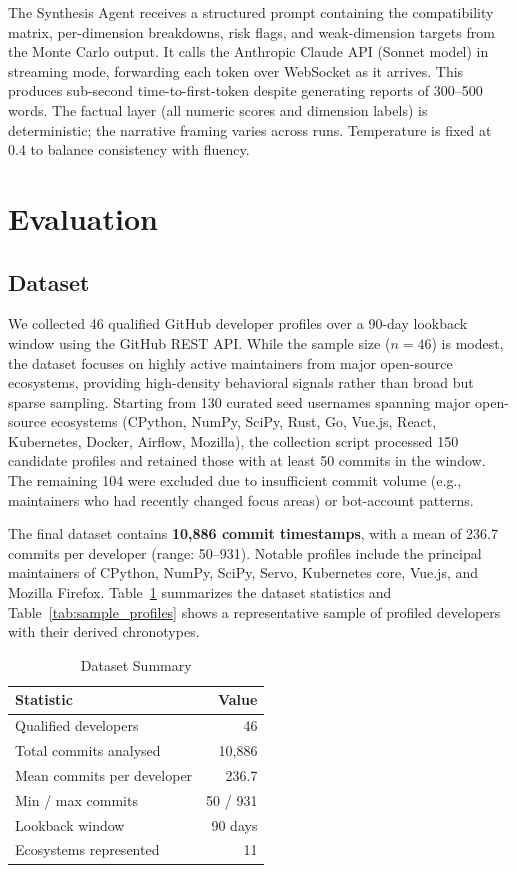 \documentclass[conference]{IEEEtran}
\begin{document}
The Synthesis Agent receives a structured prompt containing the
compatibility matrix, per-dimension breakdowns, risk flags, and
weak-dimension targets from the Monte Carlo output.  It calls the
Anthropic Claude API (Sonnet model) in streaming mode,
forwarding each token over WebSocket as it arrives.  This produces
sub-second time-to-first-token despite generating reports of
300--500 words.  The factual layer (all numeric scores and
dimension labels) is deterministic; the narrative framing
varies across runs.  Temperature is fixed at 0.4 to balance
consistency with fluency.

\section{Evaluation}
\label{sec:eval}

\subsection{Dataset}

We collected 46 qualified GitHub developer profiles over a 90-day
lookback window using the GitHub REST API.  While the sample size
($n{=}46$) is modest, the dataset focuses on highly active
maintainers from major open-source ecosystems, providing
high-density behavioral signals rather than broad but sparse
sampling.  Starting from 130 curated
seed usernames spanning major open-source ecosystems (CPython,
NumPy, SciPy, Rust, Go, Vue.js, React, Kubernetes, Docker, Airflow,
Mozilla), the collection script processed 150 candidate profiles and
retained those with at least 50 commits in the window.  The
remaining 104 were excluded due to insufficient commit volume
(e.g., maintainers who had recently changed focus areas) or
bot-account patterns.

The final dataset contains \textbf{10,886 commit timestamps}, with
a mean of 236.7 commits per developer (range: 50--931).  Notable
profiles include the principal maintainers of CPython, NumPy, SciPy,
Servo, Kubernetes core, Vue.js, and Mozilla Firefox.
Table~\ref{tab:dataset} summarizes the dataset statistics and
Table~\ref{tab:sample_profiles} shows a representative sample of
profiled developers with their derived chronotypes.

\begin{table}[t]
\caption{Dataset Summary}
\label{tab:dataset}
\centering
\small
\begin{tabular}{lr}
\toprule
Statistic & Value \\
\midrule
Qualified developers & 46 \\
Total commits analysed & 10,886 \\
Mean commits per developer & 236.7 \\
Min / max commits & 50 / 931 \\
Lookback window & 90 days \\
Ecosystems represented & 11 \\
\bottomrule
\end{tabular}
\end{table}
\end{document}
